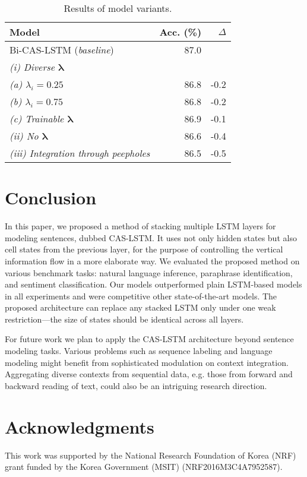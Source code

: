 \documentclass[wcp]{jmlr}
\begin{document}
    \begin{table}[t]
        \centering
        \begin{tabular}{l r r}
            \hline
            \bf{Model} & \bf{Acc. (\%)} & \bf{$\Delta$} \\
            \hline
            Bi-CAS-LSTM (\textit{baseline}) & 87.0 & \\
            \quad \textit{(i) Diverse $\bm\lambda$} & & \\
            \qquad \textit{(a) $\lambda_i=0.25$} & 86.8 & -0.2 \\
            \qquad \textit{(b) $\lambda_i=0.75$} &  86.8 & -0.2 \\
            \qquad \textit{(c) Trainable $\bm\lambda$} & 86.9 & -0.1 \\
            \quad \textit{(ii) No $\bm\lambda$} & 86.6 & -0.4 \\
            \quad \textit{(iii) Integration through peepholes} & 86.5 & -0.5 \\
            \hline
        \end{tabular}
        \caption{Results of model variants.}
        \label{table:variations}
    \end{table}
    
    \section{Conclusion}
    \label{sec:conclusion}
    In this paper, we proposed a method of stacking multiple LSTM layers for modeling sentences, dubbed CAS-LSTM.
    It uses not only hidden states but also cell states from the previous layer, for the purpose of controlling the vertical information flow in a more elaborate way.
    We evaluated the proposed method on various benchmark tasks: natural language inference, paraphrase identification, and sentiment classification.
    Our models outperformed plain LSTM-based models in all experiments and were competitive other state-of-the-art models.
    The proposed architecture can replace any stacked LSTM only under one weak restriction---the size of states should be identical across all layers.
    
    For future work we plan to apply the CAS-LSTM architecture beyond sentence modeling tasks.
    Various problems such as sequence labeling and language modeling might benefit from sophisticated modulation on context integration.
    Aggregating diverse contexts from sequential data, e.g. those from forward and backward reading of text, could also be an intriguing research direction.
    
    \section*{Acknowledgments}
    This work was supported by the National Research Foundation of Korea (NRF) grant funded by the Korea Government (MSIT) (NRF2016M3C4A7952587).
    
    
\end{document}
